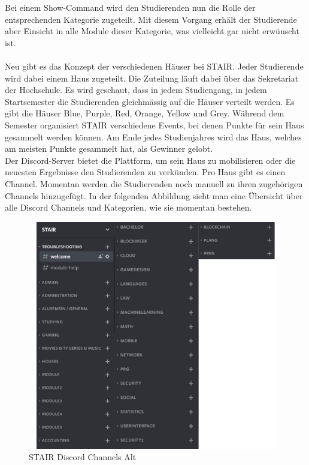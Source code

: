 \documentclass[a4paper, table]{article}
\begin{document}
Bei einem Show-Command wird den Studierenden nun die Rolle der entsprechenden Kategorie zugeteilt. 
Mit diesem Vorgang erhält der Studierende aber Einsicht in alle Module dieser Kategorie, was vielleicht gar nicht erwünscht ist.\\\\
Neu gibt es das Konzept der verschiedenen Häuser bei STAIR. 
Jeder Studierende wird dabei einem Haus zugeteilt. 
Die Zuteilung läuft dabei über das Sekretariat der Hochschule. 
Es wird geschaut, dass in jedem Studiengang, in jedem Startsemester die Studierenden gleichmässig auf die Häuser verteilt werden. 
Es gibt die Häuser Blue, Purple, Red, Orange, Yellow und Grey. 
Während dem Semester organisiert STAIR verschiedene Events, bei denen Punkte für sein Haus gesammelt werden können. 
Am Ende jedes Studienjahres wird das Haus, welches am meisten Punkte gesammelt hat, als Gewinner gelobt.\\
Der Discord-Server bietet die Plattform, um sein Haus zu mobilisieren oder die neuesten Ergebnisse den Studierenden zu verkünden. 
Pro Haus gibt es einen Channel. Momentan werden die Studierenden noch manuell zu ihren zugehörigen Channels hinzugefügt.
In der folgenden Abbildung sieht man eine Übersicht über alle Discord Channels und Kategorien, wie sie momentan bestehen.

\begin{figure}[h]
    \centering
    \includegraphics[width=1.0\textwidth,height=10cm]{img/Stair_Discord_Channels.jpg}
    \caption{STAIR Discord Channels Alt}
    \label{fig:stair_old_discord_channels}
\end{figure}
\end{document}
